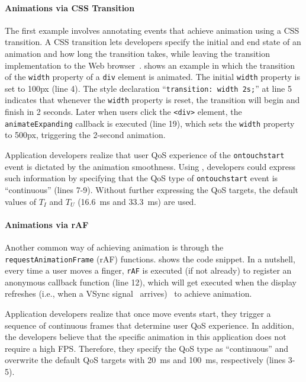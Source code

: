 \paragraph{Animations via CSS Transition} The first example involves annotating events that achieve animation using a CSS transition. A CSS transition lets developers specify the initial and end state of an animation and how long the transition takes, while leaving the transition implementation to the Web browser~\cite{csstransitions}.  shows an example in which the transition of the \texttt{width} property of a \texttt{div} element is animated. The initial \texttt{width} property is set to 100px (line 4). The style declaration ``\texttt{transition: width 2s;}'' at line 5 indicates that whenever the \texttt{width} property is reset, the transition will begin and finish in 2 seconds. Later when users click the \texttt{<div>} element, the \texttt{animateExpanding} callback is executed (line 19), which sets the \texttt{width} property to 500px, triggering the 2-second animation.

Application developers realize that user QoS experience of the \texttt{ontouchstart} event is dictated by the animation smoothness. Using \greenweb, developers could express such information by specifying that the QoS type of \texttt{ontouchstart} event is ``continuous'' (lines 7-9). Without further expressing the QoS targets, the default values of $T_I$ and $T_U$ (16.6~ms and 33.3~ms) are used.

\paragraph{Animations via rAF} Another common way of achieving animation is through the \texttt{requestAnimationFrame} (rAF) functions.  shows the code snippet. In a nutshell, every time a user moves a finger, \texttt{rAF} is executed (if not already) to register an anonymous callback function (line 12), which will get executed when the display refreshes (i.e., when a VSync signal~\cite{vsync} arrives)~\cite{jankbusting} to achieve animation.

Application developers realize that once move events start, they trigger a sequence of continuous frames that determine user QoS experience. In addition, the developers believe that the specific animation in this application does not require a high FPS. Therefore, they specify the QoS type as ``continuous'' and overwrite the default QoS targets with 20~ms and 100~ms, respectively (lines 3-5).

